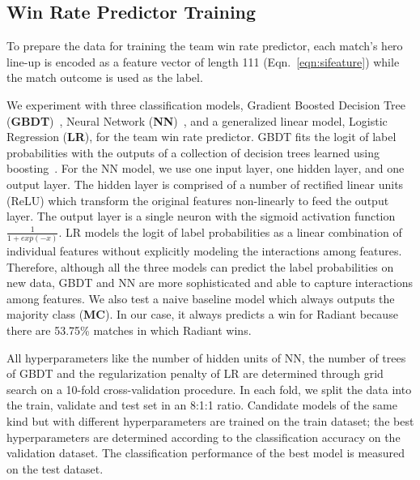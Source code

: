 \subsection{Win Rate Predictor Training}


To prepare the data for training the team win rate predictor, each match's hero line-up is encoded as a feature vector of length 111 (Eqn.~\ref{eqn:sifeature}) while the match outcome is used as the label. 

We experiment with three classification models, Gradient Boosted Decision Tree (\textbf{GBDT})~\cite{friedman2001greedy}, Neural Network (\textbf{NN})~\cite{bishop2006pattern}, and a generalized linear model, Logistic Regression (\textbf{LR}), for the team win rate predictor. GBDT fits the logit of label probabilities with the outputs of a collection of decision trees learned using boosting~\cite{friedman2000additive}. For the NN model, we use one input layer, one hidden layer, and one output layer. The hidden layer is comprised of a number of rectified linear units (ReLU) which transform the original features non-linearly to feed the output layer. The output layer is a single neuron with the sigmoid activation function $\frac{1}{1+exp(-x)}$. 
LR models the logit of label probabilities as a linear combination of individual features without explicitly modeling the interactions among features. Therefore, although all the three models can predict the label probabilities on new data, GBDT and NN are more sophisticated and able to capture interactions among features. We also test a naive baseline model which always outputs the majority class (\textbf{MC}). In our case, it always predicts a win for Radiant because there are 53.75\%  matches in which Radiant wins. 


All hyperparameters like the number of hidden units of NN, the number of trees of GBDT and the regularization penalty of LR are determined through grid search on a 10-fold cross-validation procedure. In each fold, we split the data into the train, validate and test set in an 8:1:1 ratio. Candidate models of the same kind but with different hyperparameters are trained on the train dataset; the best hyperparameters are determined according to the classification accuracy on the validation dataset. The classification performance of the best model is measured on the test dataset.  

